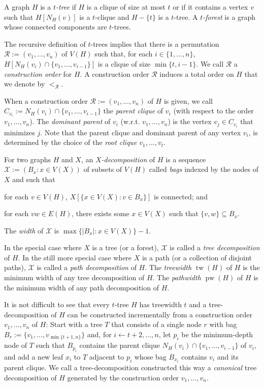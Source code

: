 \documentclass[kpfonts]{patmorin}
\DeclareMathOperator{\tw}{tw}
\DeclareMathOperator{\pw}{pw}
\theoremstyle{named}
\begin{document}
A graph $H$ is a \emph{$t$-tree} if $H$ is a clique of size at most $t$ or if it contains a vertex $v$ such that $H[N_H(v)]$ is a $t$-clique and $H-\{t\}$ is a $t$-tree.  A \emph{$t$-forest} is a graph whose connected components are $t$-trees.

The recursive definition of $t$-trees implies that there is a permutation $\mathcal{R}:=(v_1,\ldots,v_n)$ of $V(H)$ such that, for each $i\in\{1,\ldots,n\}$, $H[N_H(v_i)\cap \{v_1,\ldots,v_{i-1}\}]$ is a clique of size $\min\{t,i-1\}$.  We call $\mathcal{R}$ a \emph{construction order} for $H$.  A construction order $\mathcal{R}$ induces a total order on $H$ that we denote by $<_{\mathcal{R}}$.

When a construction order $\mathcal{R}:=(v_1,\ldots,v_n)$ of $H$ is given, we call $C_{v_i}:=N_H(v_i)\cap \{v_1,\ldots,v_{i-1}\}$ the \emph{parent clique} of $v_i$ (with respect to the order $v_1,\ldots,v_n$).  The \emph{dominant parent} of $v_i$ (w.r.t. $v_1,\ldots,v_n$) is the vertex $v_j\in C_{v_i}$ that minimizes $j$. Note that the parent clique and dominant parent of any vertex $v_i$, is determined by the choice of the \emph{root clique} $v_1,\ldots,v_{t}$.

For two graphs $H$ and $X$, an \emph{$X$-decomposition} of $H$ is a sequence $\mathcal{X}:=(B_x:x\in V(X))$ of subsets of $V(H)$ called \emph{bags} indexed by the nodes of $X$ and such that
 \begin{inparaenum}[(i)]
     \item for each $v\in V(H)$, $X[\{x\in V(X):v\in B_x\}]$ is connected; and
     \item for each $vw\in E(H)$, there exists some $x\in V(X)$ such that $\{v,w\}\subseteq B_x$.
\end{inparaenum}
The \emph{width} of $\mathcal{X}$ is $\max\{|B_x|:x\in V(X)\}-1$.

In the special case where $X$ is a tree (or a forest), $\mathcal{X}$ is called a \emph{tree decomposition} of $H$.  In the still more special case where $X$ is a path (or a collection of disjoint paths), $\mathcal{X}$ is called a \emph{path decomposition} of $H$. The \emph{treewidth} $\tw(H)$ of $H$ is the minimum width of any tree decomposition of $H$. The \emph{pathwidth} $\pw(H)$ of $H$ is the minimum width of any path decomposition of $H$.

It is not difficult to see that every $t$-tree $H$ has treewidth $t$ and a tree-decomposition of $H$ can be constructed incrementally from a construction order $v_1,\ldots,v_n$ of $H$: Start with a tree $T$ that consists of a single node $r$ with bag $B_r:=\{v_1,\ldots,v_{\min\{t+1,n\}}\}$ and, for $i\gets t+2,\ldots,n$, let $p_i$ be the minimum-depth node of $T$ such that $B_{p_i}$ contains the parent clique $N_H(v_i)\cap\{v_1,\ldots,v_{i-1}\}$ of $v_i$, and add a new leaf $x_i$ to $T$ adjacent to $p_i$ whose bag $B_{x_i}$ contains $v_i$ and its parent clique.  We call a tree-decomposition constructed this way a \emph{canonical} tree decomposition of $H$ generated by the construction order $v_1,\ldots,v_n$.
\end{document}
